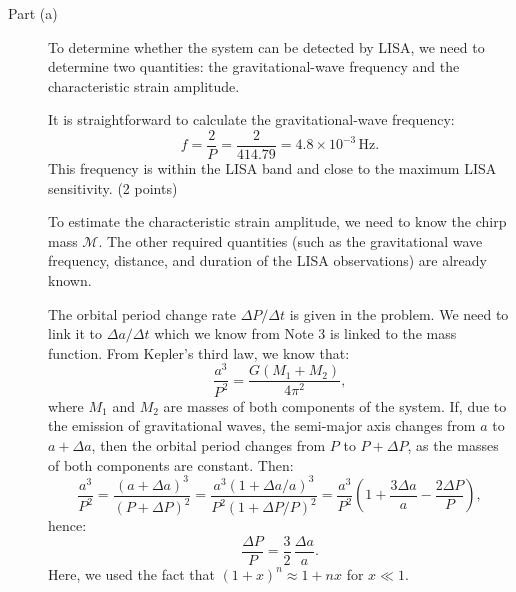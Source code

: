 \begin{description}
\item[Part (a)] To determine whether the system can be detected by LISA, we
  need to determine two quantities: the gravitational-wave frequency and the
  characteristic strain amplitude.

  It is straightforward to calculate the gravitational-wave frequency:
  \[ f = \frac{2}{P} = \frac{2}{414.79} = 4.8 \times 10^{-3}\,\mathrm{Hz}. \]
  This frequency is within the LISA band and close to the maximum LISA
  sensitivity. \hfill(2 points)

  To estimate the characteristic strain amplitude, we need to know the chirp
  mass $\mathcal{M}$. The other required quantities (such as the gravitational
  wave frequency, distance, and duration of the LISA observations) are already
  known.

  The orbital period change rate $\Delta P/\Delta t$ is given in the problem.
  We need to link it to $\Delta a/\Delta t$ which we know from Note 3 is
  linked to the mass function. From Kepler's third law, we know that:
  \[ \frac{a^3}{P^2} = \frac{G(M_1 + M_2)}{4\pi^2}, \]
  where $M_1$ and $M_2$ are masses of both components of the system. If, due
  to the emission of gravitational waves, the semi-major axis changes from $a$
  to $a + \Delta a$, then the orbital period changes from $P$ to
  $P + \Delta P$, as the masses of both components are constant. Then:
  \[ \frac{a^3}{P^2} = \frac{(a+\Delta a)^3}{(P+\Delta P)^2}
     = \frac{a^3(1+\Delta a/a)^3}{P^2(1+\Delta P/P)^2}
     = \frac{a^3}{P^2}\left(1 + \frac{3\Delta a}{a}
       - \frac{2\Delta P}{P}\right), \]
  hence:
  \[ \frac{\Delta P}{P} = \frac{3}{2}\,\frac{\Delta a}{a}. \]
  Here, we used the fact that $(1+x)^n \approx 1 + nx$ for $x \ll 1$.


\end{description}
